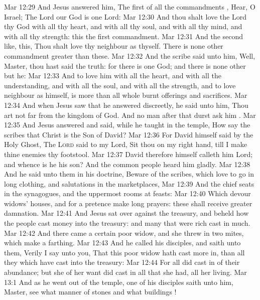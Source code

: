 \vs Mar 12:29 And Jesus answered him, The first of all the commandments , Hear, O Israel; The Lord our God is one Lord:
\vs Mar 12:30 And thou shalt love the Lord thy God with all thy heart, and with all thy soul, and with all thy mind, and with all thy strength: this  the first commandment.
\vs Mar 12:31 And the second  like,  this, Thou shalt love thy neighbour as thyself. There is none other commandment greater than these.
\vs Mar 12:32 And the scribe said unto him, Well, Master, thou hast said the truth: for there is one God; and there is none other but he:
\vs Mar 12:33 And to love him with all the heart, and with all the understanding, and with all the soul, and with all the strength, and to love  neighbour as himself, is more than all whole burnt offerings and sacrifices.
\vs Mar 12:34 And when Jesus saw that he answered discreetly, he said unto him, Thou art not far from the kingdom of God. And no man after that durst ask him .
\vs Mar 12:35 And Jesus answered and said, while he taught in the temple, How say the scribes that Christ is the Son of David?
\vs Mar 12:36 For David himself said by the Holy Ghost, The \textsc{Lord} said to my Lord, Sit thou on my right hand, till I make thine enemies thy footstool.
\vs Mar 12:37 David therefore himself calleth him Lord; and whence is he  his son? And the common people heard him gladly.
\vs Mar 12:38 And he said unto them in his doctrine, Beware of the scribes, which love to go in long clothing, and  salutations in the marketplaces,
\vs Mar 12:39 And the chief seats in the synagogues, and the uppermost rooms at feasts:
\vs Mar 12:40 Which devour widows' houses, and for a pretence make long prayers: these shall receive greater damnation.
\vs Mar 12:41 And Jesus sat over against the treasury, and beheld how the people cast money into the treasury: and many that were rich cast in much.
\vs Mar 12:42 And there came a certain poor widow, and she threw in two mites, which make a farthing.
\vs Mar 12:43 And he called  his disciples, and saith unto them, Verily I say unto you, That this poor widow hath cast more in, than all they which have cast into the treasury:
\vs Mar 12:44 For all  did cast in of their abundance; but she of her want did cast in all that she had,  all her living.
\vs Mar 13:1 And as he went out of the temple, one of his disciples saith unto him, Master, see what manner of stones and what buildings !
